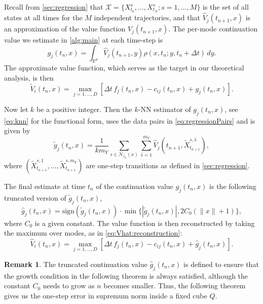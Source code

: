 \documentclass[11pt,reqno,a4paper]{amsart}
\theoremstyle{definition}
\newtheorem{remark}[theorem]{Remark}
\numberwithin{equation}{section}
\DeclareMathOperator{\R}{\mathbb{R}}
\DeclareMathOperator{\1}{\mathbbm{1}}
\begin{document}
Recall from \cref{sec:regression} that $\mathcal{X} = \{X^{s}_{t_0},\ldots,X^{s}_{t_N}; s=1,\ldots,M\}$ is the set of all states at all times for the $M$ independent trajectories, and that $\widehat{V}_j(t_{n+1},x)$ is an approximation of the value function $V_j(t_{n+1},x)$. The per-mode continuation value we estimate in \cref{alg:main} at each time-step is 
\begin{equation*}
  g_j(t_n,x) = \int_{\R^d}{\widehat V}_j(t_{n+1},y)\rho(x,t_n;y,t_n+\Delta t)\,dy.
\end{equation*}
The approximate value function, which serves as the target in our theoretical analysis, is then
\begin{equation} \label{eq:tildeV}
  \widetilde{V}_i(t_n,x) = \max_{j=1,\dots,D}\left[\Delta t\,f_j(t_n,x)
    - c_{ij}(t_n,x) + g_j(t_n,x)\right].
\end{equation}

Now let $k$ be a positive integer. Then the $k$-NN estimator of $g_j(t_n,x)$, see \cref{eq:knn} for the functional form, uses the data pairs in \cref{eq:regressionPairs} and is given by
\begin{equation} \label{eq:gjtilde}
  \widetilde{g}_j(t_n,x) = \frac{1}{k m_Y} \sum_{s \in \mathcal{N}_{t_n}(x)} \sum_{\hat{s}=1}^{m_Y}
    \widehat{V}_j(t_{n+1}, \widetilde{X}_{t_{n+1}}^{s,\hat{s}}),
\end{equation}
where $(\widetilde{X}_{t_{n+1}}^{s,1},\ldots,\widetilde{X}_{t_{n+1}}^{s,m_Y})$ are one-step transitions as defined in \cref{sec:regression}.

The final estimate at time $t_n$ of the continuation value $g_j(t_n,x)$ is the following truncated version of $\widetilde{g}_j(t_n,x)$,
\begin{equation} \label{eq:truncation}
  \widehat{g}_j(t_n,x) = \mathrm{sign}(\widetilde{g}_j(t_n,x)) \cdot \min\{|\widetilde{g}_j(t_n,x)|, 2 C_0(\|x\|+1)\},
\end{equation}
where $C_0$ is a given constant. The value function is then reconstructed by taking the maximum over modes, as in \cref{eq:Vhat:reconstruction}:
\begin{equation} \label{eq:Vhat:theoretical}
  \widehat{V}_i(t_n,x) = \max_{j=1,\dots,D}\left[\Delta t\,f_j(t_n,x)
    - c_{ij}(t_n,x) + \widehat{g}_j(t_n,x)\right].
\end{equation}

\begin{remark}
  The truncated continuation value $\widehat{g}_j(t_n,x)$ is defined to ensure that the growth condition in the following theorem is always satisfied, although the constant $C_0$ needs to grow as $n$ becomes smaller. Thus, the following theorem gives us the one-step error in supremum norm inside a fixed cube $Q$.
\end{remark}
\end{document}
